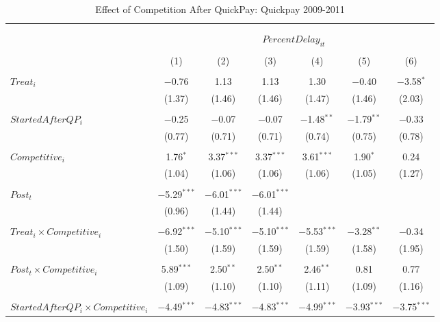 \documentclass[
]{article}
\begin{document}
\begin{table}[H] \centering 
  \caption{Effect of Competition After QuickPay: Quickpay 2009-2011} 
  \label{} 
\small 
\begin{tabular}{@{\extracolsep{-3pt}}lcccccc} 
\\[-1.8ex]\hline 
\hline \\[-1.8ex] 
\\[-1.8ex] & \multicolumn{6}{c}{$PercentDelay_{it}$  } \\ 
\\[-1.8ex] & (1) & (2) & (3) & (4) & (5) & (6)\\ 
\hline \\[-1.8ex] 
 $Treat_i$ & $-$0.76 & 1.13 & 1.13 & 1.30 & $-$0.40 & $-$3.58$^{*}$ \\ 
  & (1.37) & (1.46) & (1.46) & (1.47) & (1.46) & (2.03) \\ 
  & & & & & & \\ 
 $StartedAfterQP_i$ & $-$0.25 & $-$0.07 & $-$0.07 & $-$1.48$^{**}$ & $-$1.79$^{**}$ & $-$0.33 \\ 
  & (0.77) & (0.71) & (0.71) & (0.74) & (0.75) & (0.78) \\ 
  & & & & & & \\ 
 $Competitive_i$ & 1.76$^{*}$ & 3.37$^{***}$ & 3.37$^{***}$ & 3.61$^{***}$ & 1.90$^{*}$ & 0.24 \\ 
  & (1.04) & (1.06) & (1.06) & (1.06) & (1.05) & (1.27) \\ 
  & & & & & & \\ 
 $Post_t$ & $-$5.29$^{***}$ & $-$6.01$^{***}$ & $-$6.01$^{***}$ &  &  &  \\ 
  & (0.96) & (1.44) & (1.44) &  &  &  \\ 
  & & & & & & \\ 
 $Treat_i \times Competitive_i$ & $-$6.92$^{***}$ & $-$5.10$^{***}$ & $-$5.10$^{***}$ & $-$5.53$^{***}$ & $-$3.28$^{**}$ & $-$0.34 \\ 
  & (1.50) & (1.59) & (1.59) & (1.59) & (1.58) & (1.95) \\ 
  & & & & & & \\ 
 $Post_t \times Competitive_i$ & 5.89$^{***}$ & 2.50$^{**}$ & 2.50$^{**}$ & 2.46$^{**}$ & 0.81 & 0.77 \\ 
  & (1.09) & (1.10) & (1.10) & (1.11) & (1.09) & (1.16) \\ 
  & & & & & & \\ 
 $StartedAfterQP_i \times Competitive_i$ & $-$4.49$^{***}$ & $-$4.83$^{***}$ & $-$4.83$^{***}$ & $-$4.99$^{***}$ & $-$3.93$^{***}$ & $-$3.75$^{***}$ \\ 

\end{tabular}
\end{table}
\end{document}
